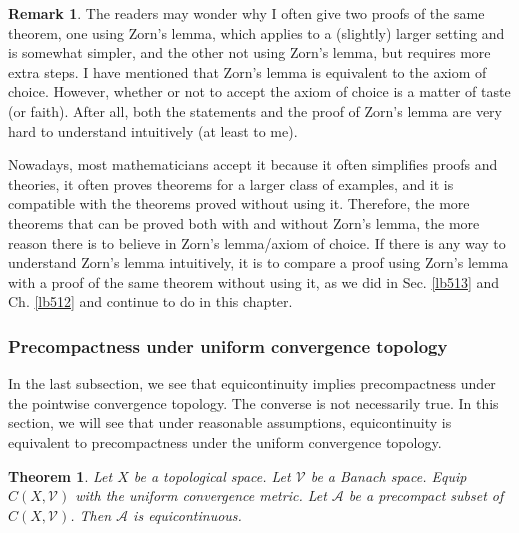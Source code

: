 \documentclass[12pt,b5paper,notitlepage]{article}
\theoremstyle{definition}
\newtheorem{rem}[df]{Remark}
\theoremstyle{plain}
\newtheorem{thm}[df]{Theorem}
\newcommand{\mc}{\mathcal}
\newcommand{\scr}{\mathscr}
\numberwithin{equation}{section}
\begin{document}
\begin{rem}
The readers may wonder why I often give two proofs of the same theorem, one using Zorn's lemma, which applies to a (slightly) larger setting and is somewhat simpler, and the other not using Zorn's lemma, but requires more extra steps. I have mentioned that Zorn's lemma is equivalent to the axiom of choice. However, whether or not to accept the axiom of choice is a matter of taste (or faith). After all, both the statements and the proof of Zorn's lemma are very hard to understand intuitively (at least to me).  

Nowadays, most mathematicians accept it because it often simplifies proofs and theories, it often proves theorems for a larger class of examples, and it is compatible with the theorems proved without using it. Therefore, the more theorems that can be proved both with and without Zorn's lemma, the more reason there is to believe in Zorn's lemma/axiom of choice. If there is any way to understand Zorn's lemma intuitively, it is to compare a proof using Zorn's lemma with a proof of the same theorem without using it, as we did in Sec. \ref{lb513} and Ch. \ref{lb512} and continue to do in this chapter.   \hfill\qedsymbol
\end{rem}



\subsubsection{Precompactness under uniform convergence topology}

In the last subsection, we see that equicontinuity implies precompactness under the pointwise convergence topology. The converse is not necessarily true. In this section, we will see that under reasonable assumptions, equicontinuity is equivalent to precompactness under the uniform convergence topology.


\begin{thm}\label{lb515}
Let $X$ be a topological space. Let $\mc V$ be a Banach space. Equip $C(X,\mc V)$ with the uniform convergence metric. Let $\scr A$ be a precompact subset of $C(X,\mc V)$. Then $\scr A$ is equicontinuous.
\end{thm}
\end{document}
